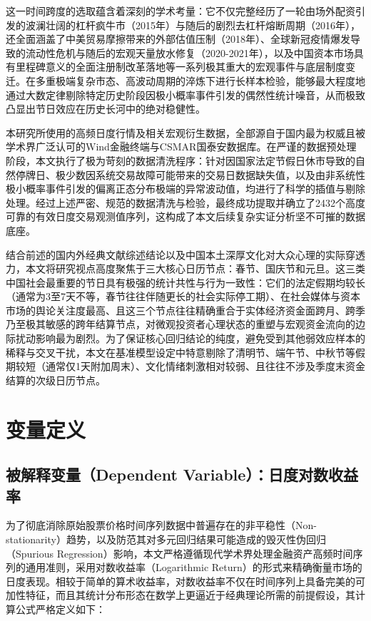 \documentclass{cupb-thesis}
\begin{document}
这一时间跨度的选取蕴含着深刻的学术考量：它不仅完整经历了一轮由场外配资引发的波澜壮阔的杠杆疯牛市（2015年）与随后的剧烈去杠杆熔断周期（2016年），还全面涵盖了中美贸易摩擦带来的外部估值压制（2018年）、全球新冠疫情爆发导致的流动性危机与随后的宏观天量放水修复（2020-2021年），以及中国资本市场具有里程碑意义的全面注册制改革落地等一系列极其重大的宏观事件与底层制度变迁。在多重极端复杂市态、高波动周期的淬炼下进行长样本检验，能够最大程度地通过大数定律剔除特定历史阶段因极小概率事件引发的偶然性统计噪音，从而极致凸显出节日效应在历史长河中的绝对稳健性。


本研究所使用的高频日度行情及相关宏观衍生数据，全部源自于国内最为权威且被学术界广泛认可的Wind金融终端与CSMAR国泰安数据库。在严谨的数据预处理阶段，本文执行了极为苛刻的数据清洗程序：针对因国家法定节假日休市导致的自然停牌日、极少数因系统交易故障可能带来的交易日数据缺失值，以及由非系统性极小概率事件引发的偏离正态分布极端的异常波动值，均进行了科学的插值与剔除处理。经过上述严密、规范的数据清洗与检验，最终成功提取并确立了2432个高度可靠的有效日度交易观测值序列，这构成了本文后续复杂实证分析坚不可摧的数据底座。


结合前述的国内外经典文献综述结论以及中国本土深厚文化对大众心理的实际穿透力，本文将研究视点高度聚焦于三大核心日历节点：春节、国庆节和元旦。这三类中国社会最重要的节日具有极强的统计共性与行为一致性：它们的法定假期均较长（通常为3至7天不等，春节往往伴随更长的社会实际停工期）、在社会媒体与资本市场的舆论关注度最高、且这三个节点往往精确重合于实体经济资金面跨月、跨季乃至极其敏感的跨年结算节点，对微观投资者心理状态的重塑与宏观资金流向的边际扰动影响最为剧烈。为了保证核心回归结论的纯度，避免受到其他弱效应样本的稀释与交叉干扰，本文在基准模型设定中特意剔除了清明节、端午节、中秋节等假期较短（通常仅1天附加周末）、文化情绪刺激相对较弱、且往往不涉及季度末资金结算的次级日历节点。


\section{变量定义}


\subsection{被解释变量（Dependent Variable）：日度对数收益率}


为了彻底消除原始股票价格时间序列数据中普遍存在的非平稳性（Non-stationarity）趋势，以及防范其对多元回归结果可能造成的毁灭性伪回归（Spurious Regression）影响，本文严格遵循现代学术界处理金融资产高频时间序列的通用准则，采用对数收益率（Logarithmic Return）的形式来精确衡量市场的日度表现。相较于简单的算术收益率，对数收益率不仅在时间序列上具备完美的可加性特征，而且其统计分布形态在数学上更逼近于经典理论所需的前提假设，其计算公式严格定义如下：
\end{document}
